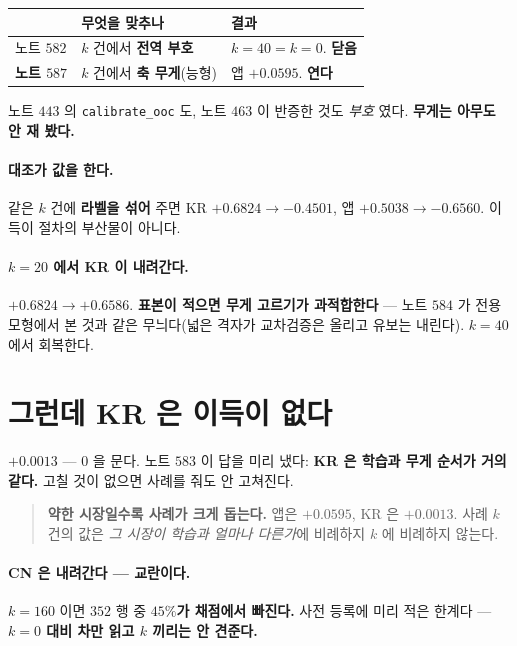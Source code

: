 \documentclass[11pt]{article}
\begin{document}
\begin{center}
\begin{tabular}{lll}
\hline
 & 무엇을 맞추나 & 결과 \\
\hline
노트 $582$ & $k$ 건에서 \textbf{전역 부호} & $k{=}40 = k{=}0$. \textbf{닫음} \\
\textbf{노트 $587$} & $k$ 건에서 \textbf{축 무게}(능형) & 앱 $\mathbf{+0.0595}$. \textbf{연다} \\
\hline
\end{tabular}
\end{center}

노트 $443$ 의 \texttt{calibrate\_ooc} 도, 노트 $463$ 이 반증한 것도
\emph{부호} 였다. \textbf{무게는 아무도 안 재 봤다.}

\paragraph{대조가 값을 한다.}
같은 $k$ 건에 \textbf{라벨을 섞어} 주면 KR $+0.6824 \to -0.4501$, 앱
$+0.5038 \to -0.6560$. 이득이 절차의 부산물이 아니다.

\paragraph{$k{=}20$ 에서 KR 이 내려간다.}
$+0.6824 \to +0.6586$. \textbf{표본이 적으면 무게 고르기가 과적합한다} ---
노트 $584$ 가 전용 모형에서 본 것과 같은 무늬다(넓은 격자가 교차검증은
올리고 유보는 내린다). $k{=}40$ 에서 회복한다.

\section{그런데 KR 은 이득이 없다}

$+0.0013$ --- $0$ 을 문다. 노트 $583$ 이 답을 미리 냈다: \textbf{KR 은
학습과 무게 순서가 거의 같다.} 고칠 것이 없으면 사례를 줘도 안 고쳐진다.

\begin{quote}
\textbf{약한 시장일수록 사례가 크게 돕는다.} 앱은 $+0.0595$, KR 은
$+0.0013$. 사례 $k$ 건의 값은 \emph{그 시장이 학습과 얼마나 다른가}에
비례하지 \emph{$k$} 에 비례하지 않는다.
\end{quote}

\paragraph{CN 은 내려간다 --- 교란이다.}
$k{=}160$ 이면 $352$ 행 중 \textbf{$45\%$가 채점에서 빠진다.} 사전 등록에
미리 적은 한계다 --- \textbf{$k{=}0$ 대비 차만 읽고 $k$ 끼리는 안 견준다.}
\end{document}
